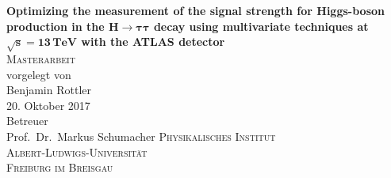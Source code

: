\begin{titlepage}
\begin{center}
    {\huge \textbf{Optimizing the measurement of the signal strength for Higgs-boson production in the $\bm{H \to \tau\tau}$ decay using multivariate techniques at $\bm{\sqrt{s} = 13\,\text{TeV}}$ with the ATLAS detector}}\\[2cm]

	\textsc{\LARGE Masterarbeit}\\[2cm]

    {\large vorgelegt von}\\[0.5cm]
    {\Large Benjamin Rottler} \\[0.5cm]
    {\large 20. Oktober 2017} \\[2cm]

    {\large Betreuer}\\[0.5cm]
    {\Large Prof.\ Dr.\ Markus Schumacher}
  	\vfill
	\large
	\textsc{Physikalisches Institut} \\
	\textsc{Albert-Ludwigs-Universität} \\
	\textsc{Freiburg im Breisgau} \\[1cm]
\end{center}
\end{titlepage}
